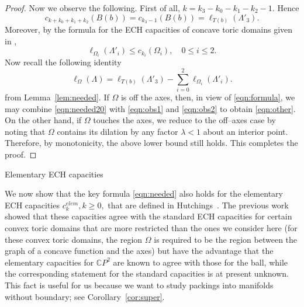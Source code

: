 \documentclass[11pt, reqno]{amsart}
\makeatletter
\def\subsection{\@startsection{subsection}{2}%
  \z@{.75\linespacing\@plus.7\linespacing}{-.5em}%
  {\normalfont\large\bfseries}}
\theoremstyle{remark}
\numberwithin{equation}{subsection}
\numberwithin{figure}{section}
\theoremstyle{customremark}
\newcommand{\C}{\mathbb{C}}
\makeatother
\begin{document}
\begin{proof}
Now we observe the following.  First of all, $k = k_3 - k_0- k_1 - k_2 - 1$.   Hence
\begin{equation*}
\label{eqn:obs1}
 c_{k + k_0+ k_1 + k_2}(B(b)) = c_{k_3-1}(B(b)) = \ell_{T(b)}( \Lambda'_3).
 \end{equation*}
Moreover, by the formula for the ECH capacities  of concave toric domains given in \cite[Thm.1.21]{Choi},
\begin{equation}
\label{eqn:obs2} 
\ell_{\Omega_i}(\Lambda'_i) \le c_{k_i}(\Omega_i), \quad 0 \le i \le 2.
\end{equation}
Now recall the following identity 
\begin{equation}
\label{eqn:needed20}
\ell_\Omega(\Lambda) = \ell_{T(b)}(\Lambda'_3) - \sum^2_{i=0}\ell_{\Omega_i}(\Lambda'_i). 
\end{equation}
from Lemma~\ref{lem:needed}.
If 
$\Omega$ is off the axes, then, in view of \eqref{eqn:formula}, we may combine \eqref{eqn:needed20} with \eqref{eqn:obs1} and \eqref{eqn:obs2} to obtain \eqref{eqn:other}.
On the other hand, if  $\Omega$ touches the axes, we  reduce to the off--axes case by noting that $\Omega$ contains its dilation by any factor $\lambda < 1$ about an interior point. Therefore, by monotonicity, the above lower bound still holds.
This completes the proof. \end{proof}



 


      
  
      
\subsection{Elementary ECH capacities}\label{ss:elem}



We now show that
the key formula \eqref{eqn:needed} also holds for the elementary ECH capacities  $c^{elem}_k, k\ge 0,$ that are
defined in Hutchings~\cite{Helem}.  The previous work \cite{Helem} showed that these 
 capacities agree with  the standard ECH capacities  for 
certain convex toric domains that are more restricted than the ones we consider here (for these convex toric domains, the region $\Omega$ is required to be the region between the graph of a concave function and the axes) 
 but have the advantage that
  the elementary capacities for $\C P^2$ are known to agree with those for the ball, while the corresponding statement for the standard capacities is at present unknown.    This fact is useful for us because we want to study packings into manifolds without boundary; see Corollary~\ref{cor:super}.  
  
\end{document}
